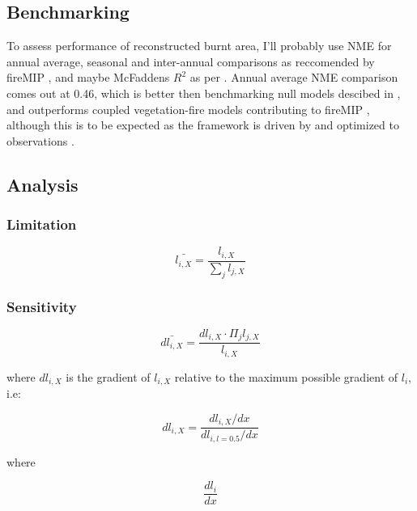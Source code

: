 \subsection{Benchmarking}
\begin{shaded}
To assess performance of reconstructed burnt area, I'll probably use NME for annual average, seasonal and inter-annual comparisons \citep{kelley2013comprehensive} as reccomended by fireMIP \citet{gmd-2016-237, hantson2016status}, and maybe McFaddens $R^{2}$ as per \citep{bistinas2014causal}. Annual average NME comparison comes out at 0.46, which is better then benchmarking null models descibed in \citet{kelley2013comprehensive}, and outperforms coupled vegetation-fire models contributing to fireMIP \citep{hantson2016status}, although this is to be expected as the framework is driven by and optimized to observations \citep{kelley2013comprehensive}.
\end{shaded}
\subsection{Analysis}


\subsubsection{Limitation}

\begin{equation}
    \bar{l_{i, X}} = \frac{l_{i, X}}{\sum_{j} l_{j, X}}
\end{equation}

\subsubsection{Sensitivity}

\begin{equation}
    \bar{dl_{i, X}} = \frac{dl_{i, X} \cdot \Pi_{j} l_{j, X}}{l_{i, X}}
\end{equation}

where $dl_{i, X}$ is the gradient of $l_{i, X}$ relative to the maximum possible gradient of $l_{i}$, i.e:

\begin{equation}
    dl_{i, X} = \frac{dl_{i, X} / dx}{dl_{i, l = 0.5} / dx}
\end{equation}

where

\begin{equation}
    \frac{dl_{i}}{dx}
\end{equation}
